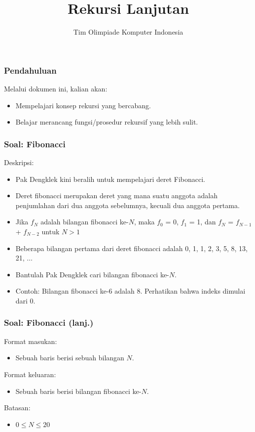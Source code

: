 

\title{Rekursi Lanjutan}
\author{Tim Olimpiade Komputer Indonesia}
\date{}



\begin{frame}
\titlepage
\end{frame}

\begin{frame}
\frametitle{Pendahuluan}
Melalui dokumen ini, kalian akan:
\begin{itemize}
  \item Mempelajari konsep rekursi yang bercabang.
  \item Belajar merancang fungsi/prosedur rekursif yang lebih sulit.
\end{itemize}
\end{frame}

\begin{frame}
\frametitle{Soal: Fibonacci}
Deskripsi:
\begin{itemize}
  \item Pak Dengklek kini beralih untuk mempelajari deret Fibonacci.
  \item Deret fibonacci merupakan deret yang mana suatu anggota adalah penjumlahan dari dua anggota sebelumnya, kecuali dua anggota pertama.
  \item Jika $f_N$ adalah bilangan fibonacci ke-$N$, maka $f_0$ = 0, $f_1$ = 1, dan $f_N$ = $f_{N-1}$ + $f_{N-2}$ untuk $N > 1$
  \item Beberapa bilangan pertama dari deret fibonacci adalah 0, 1, 1, 2, 3, 5, 8, 13, 21, $\dots$
  \item Bantulah Pak Dengklek cari bilangan fibonacci ke-$N$.
  \item Contoh: Bilangan fibonacci ke-6 adalah 8. Perhatikan bahwa indeks dimulai dari 0.
\end{itemize}
\end{frame}

\begin{frame}
\frametitle{Soal: Fibonacci (lanj.) }
Format masukan:
\begin{itemize}
    \item Sebuah baris berisi sebuah bilangan $N$.
\end{itemize}
Format keluaran:
\begin{itemize}
    \item Sebuah baris berisi bilangan fibonacci ke-$N$.
\end{itemize}
Batasan:
\begin{itemize}
    \item $0 \le N \le 20$
\end{itemize}
\end{frame}

